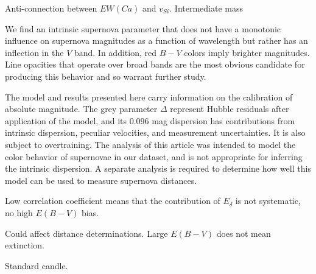 \documentclass{aastex}   	%
\begin{document}
Anti-connection between $EW(Ca)$ and $v_{Si}$.  Intermediate mass

We find an intrinsic supernova parameter that does not have a monotonic influence on supernova magnitudes as a function
of wavelength but rather has an inflection in the $V$ band.  In addition, red $B-V$ colors imply brighter magnitudes.  Line opacities
that operate over broad bands are the most obvious candidate for producing this behavior and so warrant further study.

The model and results presented here
carry information on the calibration of absolute magnitude.  The grey parameter $\Delta$ represent Hubble residuals after
application of the model, and its  $0.096$ mag dispersion has contributions from intrinsic dispersion, peculiar velocities, and
measurement uncertainties.  It is also subject to overtraining.
The  analysis of this article was intended to model the color behavior of supernovae in our dataset,
and is not appropriate for inferring the intrinsic dispersion.  A separate analysis is required to determine how
well this model can be used to measure supernova distances.

Low correlation coefficient means that the contribution of $E_\delta$ is not systematic, no high $E(B-V)$ bias.

Could affect distance determinations.  Large $E(B-V)$ does not mean extinction.


Standard candle.
\acknowledgments
\end{document}
